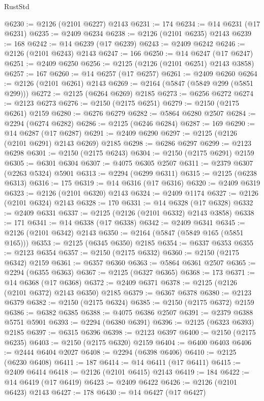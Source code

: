 \begin{lexlean}{RustStd}
\begin{coremodule}
@6230 := @2126 (@2101 @6227) @2143
@6231 := 174
@6234 := @14 @6231 (@17 @6231)
@6235 := @2409 @6234
@6238 := @2126 (@2101 @6235) @2143
@6239 := 168
@6242 := @14 @6239 (@17 @6239)
@6243 := @2409 @6242
@6246 := @2126 (@2101 @6243) @2143
@6247 := 166
@6250 := @14 @6247 (@17 @6247)
@6251 := @2409 @6250
@6256 := @2125 (@2126 (@2101 @6251) @2143 @3858)
@6257 := 167
@6260 := @14 @6257 (@17 @6257)
@6261 := @2409 @6260
@6264 := @2126 (@2101 @6261) @2143
@6269 := @2164 (@5847 (@5849 @299 (@5851 @299)))
@6272 := @2125 (@6264 @6269) @2185
@6273 := @6256 @6272
@6274 := @2123 @6273
@6276 := @2150 (@2175 @6251)
@6279 := @2150 (@2175 @6261) @2159
@6280 := @6276 @6279
@6282 := @5864 @6280 @2507
@6284 := @2294 (@6274 @6282)
@6286 := @2125 (@6246 @6284)
@6287 := 169
@6290 := @14 @6287 (@17 @6287)
@6291 := @2409 @6290
@6297 := @2125 (@2126 (@2101 @6291) @2143 @6269) @2185
@6298 := @6286 @6297
@6299 := @2123 @6298
@6301 := @2150 (@2175 @6243)
@6304 := @2150 (@2175 @6291) @2159
@6305 := @6301 @6304
@6307 := @4075 @6305 @2507
@6311 := @2379 @6307 (@2263 @5324) @5901
@6313 := @2294 (@6299 @6311)
@6315 := @2125 (@6238 @6313)
@6316 := 175
@6319 := @14 @6316 (@17 @6316)
@6320 := @2409 @6319
@6323 := @2126 (@2101 @6320) @2143
@6324 := @2409 @1174
@6327 := @2126 (@2101 @6324) @2143
@6328 := 170
@6331 := @14 @6328 (@17 @6328)
@6332 := @2409 @6331
@6337 := @2125 (@2126 (@2101 @6332) @2143 @3858)
@6338 := 171
@6341 := @14 @6338 (@17 @6338)
@6342 := @2409 @6341
@6345 := @2126 (@2101 @6342) @2143
@6350 := @2164 (@5847 (@5849 @165 (@5851 @165)))
@6353 := @2125 (@6345 @6350) @2185
@6354 := @6337 @6353
@6355 := @2123 @6354
@6357 := @2150 (@2175 @6332)
@6360 := @2150 (@2175 @6342) @2159
@6361 := @6357 @6360
@6363 := @5864 @6361 @2507
@6365 := @2294 (@6355 @6363)
@6367 := @2125 (@6327 @6365)
@6368 := 173
@6371 := @14 @6368 (@17 @6368)
@6372 := @2409 @6371
@6378 := @2125 (@2126 (@2101 @6372) @2143 @6350) @2185
@6379 := @6367 @6378
@6380 := @2123 @6379
@6382 := @2150 (@2175 @6324)
@6385 := @2150 (@2175 @6372) @2159
@6386 := @6382 @6385
@6388 := @4075 @6386 @2507
@6391 := @2379 @6388 @5751 @5901
@6393 := @2294 (@6380 @6391)
@6396 := @2125 (@6323 @6393) @2185
@6397 := @6315 @6396
@6398 := @2123 @6397
@6400 := @2150 (@2175 @6235)
@6403 := @2150 (@2175 @6320) @2159
@6404 := @6400 @6403
@6406 := @2444 @6404 @2027
@6408 := @2294 (@6398 @6406)
@6410 := @2125 (@6230 @6408)
@6411 := 187
@6414 := @14 @6411 (@17 @6411)
@6415 := @2409 @6414
@6418 := @2126 (@2101 @6415) @2143
@6419 := 184
@6422 := @14 @6419 (@17 @6419)
@6423 := @2409 @6422
@6426 := @2126 (@2101 @6423) @2143
@6427 := 178
@6430 := @14 @6427 (@17 @6427)

\end{coremodule}
\end{lexlean}
